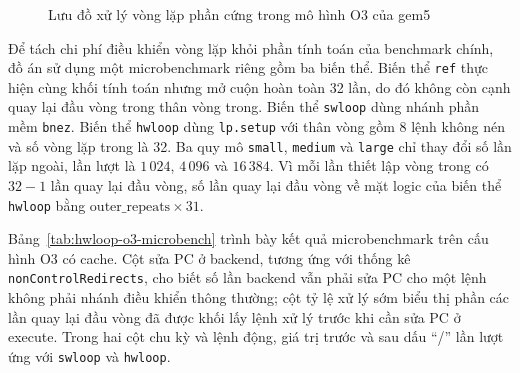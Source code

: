 \documentclass[../DoAn.tex]{subfiles}
\begin{document}
\begin{figure}[H]
    \centering
    
    \caption{Lưu đồ xử lý vòng lặp phần cứng trong mô hình O3 của gem5}
    \label{fig:hwloop-o3-frontend}
\end{figure}

Để tách chi phí điều khiển vòng lặp khỏi phần tính toán của benchmark chính, đồ án sử dụng một microbenchmark riêng gồm ba biến thể. Biến thể \texttt{ref} thực hiện cùng khối tính toán nhưng mở cuộn hoàn toàn 32 lần, do đó không còn cạnh quay lại đầu vòng trong thân vòng trong. Biến thể \texttt{swloop} dùng nhánh phần mềm \texttt{bnez}. Biến thể \texttt{hwloop} dùng \texttt{lp.setup} với thân vòng gồm 8 lệnh không nén và số vòng lặp trong là 32. Ba quy mô \texttt{small}, \texttt{medium} và \texttt{large} chỉ thay đổi số lần lặp ngoài, lần lượt là \(1\,024\), \(4\,096\) và \(16\,384\). Vì mỗi lần thiết lập vòng trong có \(32-1\) lần quay lại đầu vòng, số lần quay lại đầu vòng về mặt logic của biến thể \texttt{hwloop} bằng \(\text{outer\_repeats} \times 31\).

Bảng~\ref{tab:hwloop-o3-microbench} trình bày kết quả microbenchmark trên cấu hình O3 có cache. Cột sửa PC ở backend, tương ứng với thống kê \texttt{nonControlRedirects}, cho biết số lần backend vẫn phải sửa PC cho một lệnh không phải nhánh điều khiển thông thường; cột tỷ lệ xử lý sớm biểu thị phần các lần quay lại đầu vòng đã được khối lấy lệnh xử lý trước khi cần sửa PC ở execute. Trong hai cột chu kỳ và lệnh động, giá trị trước và sau dấu ``/'' lần lượt ứng với \texttt{swloop} và \texttt{hwloop}.
\end{document}
